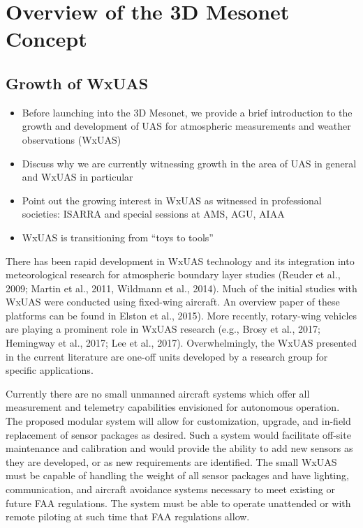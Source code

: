 \documentclass[sensors,review,submit,moreauthors,pdftex,10pt,a4paper]{mdpi}
\theoremstyle{mdpi}
\newcounter{ex}
\newcounter{re}
\theoremstyle{mdpidefinition}
\begin{document}
\section{Overview of the 3D Mesonet Concept}

\subsection{Growth of WxUAS}
\begin{itemize}[leftmargin=*,labelsep=4mm]
\color{blue}
\item	Before launching into the 3D Mesonet, we provide a brief introduction to the growth and development of UAS for atmospheric measurements and weather observations (WxUAS)
\item	Discuss why we are currently witnessing growth in the area of UAS in general and WxUAS in particular
\item	Point out the growing interest in WxUAS as witnessed in professional societies: ISARRA and special sessions at AMS, AGU, AIAA
\item	WxUAS is transitioning from ``toys to tools''
\end{itemize}

There has been rapid development in WxUAS technology and its integration into meteorological research for atmospheric boundary layer studies (Reuder et al., 2009; Martin et al., 2011, Wildmann et al., 2014). Much of the initial studies with WxUAS were conducted using fixed-wing aircraft. An overview paper of these platforms can be found in Elston et al., 2015). More recently, rotary-wing vehicles are playing a prominent role in WxUAS research (e.g., Brosy et al., 2017; Hemingway et al., 2017; Lee et al., 2017). Overwhelmingly, the WxUAS presented in the current literature are one-off units developed by a research group for specific applications. 

Currently there are no small unmanned aircraft systems which offer all measurement and telemetry capabilities envisioned for autonomous operation. The proposed modular system will allow for customization, upgrade, and in-field replacement of sensor packages as desired. Such a system would facilitate off-site maintenance and calibration and would provide the ability to add new sensors as they are developed, or as new requirements are identified. The small WxUAS must be capable of handling the weight of all sensor packages and have lighting, communication, and aircraft avoidance systems necessary to meet existing or future FAA regulations. The system must be able to operate unattended or with remote piloting at such time that FAA regulations allow.
\end{document}
